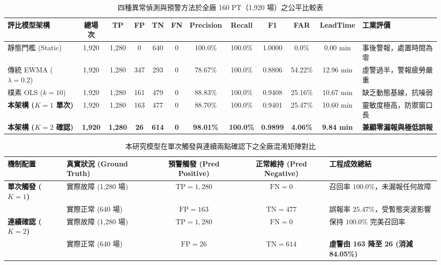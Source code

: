 \documentclass[fontset=none, a4paper, 12pt]{ctexart}
\begin{document}
\begin{table}[H]
    \centering
    \caption{四種異常偵測與預警方法於全廠 160 PT（1,920 場）之公平比較表}
    \label{tab:model_benchmark}
    \footnotesize
    \setlength{\tabcolsep}{2.5pt}
    \begin{tabularx}{\textwidth}{lccccccccccX}
        \toprule
        \textbf{評比模型架構} & \textbf{總場次} & \textbf{TP} & \textbf{FP} & \textbf{TN} & \textbf{FN} & \textbf{Precision} & \textbf{Recall} & \textbf{F1} & \textbf{FAR} & \textbf{LeadTime} & \textbf{工業評價} \\
        \midrule
        靜態門檻 (Static) & 1,920 & 1,280 & 0 & 640 & 0 & 100.0\% & 100.0\% & 1.0000 & 0.0\% & 0.00 min & 事後警報，處置時間為零 \\
        傳統 EWMA ($\lambda=0.2$) & 1,920 & 1,280 & 347 & 293 & 0 & 78.67\% & 100.0\% & 0.8806 & 54.22\% & 12.96 min & 虛警過半，警報疲勞嚴重 \\
        樸素 OLS ($k=10$) & 1,920 & 1,280 & 161 & 479 & 0 & 88.83\% & 100.0\% & 0.9408 & 25.16\% & 10.67 min & 缺乏動態基線，抗噪弱 \\
        \textbf{本架構 ($K=1$ 單次)} & 1,920 & 1,280 & 163 & 477 & 0 & 88.70\% & 100.0\% & 0.9401 & 25.47\% & 10.60 min & 靈敏度極高，防禦窗口長 \\
        \textbf{本架構 ($K=2$ 確認)} & \textbf{1,920} & \textbf{1,280} & \textbf{26} & \textbf{614} & \textbf{0} & \textbf{98.01\%} & \textbf{100.0\%} & \textbf{0.9899} & \textbf{4.06\%} & \textbf{9.84 min} & \textbf{兼顧零漏報與極低誤報} \\
        \bottomrule
    \end{tabularx}
\end{table}

\begin{table}[H]
    \centering
    \caption{本研究模型在單次觸發與連續兩點確認下之全廠混淆矩陣對比}
    \label{tab:confusion_matrices}
    \small
    \begin{tabularx}{\textwidth}{llccX}
        \toprule
        \textbf{機制配置} & \textbf{真實狀況 (Ground Truth)} & \textbf{預警觸發 (Pred Positive)} & \textbf{正常維持 (Pred Negative)} & \textbf{工程成效總結} \\
        \midrule
        \textbf{單次觸發 ($K=1$)} & 實際故障 (1,280 場) & $\text{TP} = 1,280$ & $\text{FN} = 0$ & 召回率 $100.0\%$，未漏報任何故障 \\
        & 實際正常 (640 場) & $\text{FP} = 163$ & $\text{TN} = 477$ & 誤報率 $25.47\%$，受暫態突波影響 \\
        \midrule
        \textbf{連續確認 ($K=2$)} & 實際故障 (1,280 場) & $\text{TP} = 1,280$ & $\text{FN} = 0$ & 保持 $100.0\%$ 完美召回率 \\
        & 實際正常 (640 場) & $\text{FP} = 26$ & $\text{TN} = 614$ & \textbf{虛警由 163 降至 26 (消減 84.05\%)} \\
        \bottomrule
    \end{tabularx}
\end{table}
\end{document}
